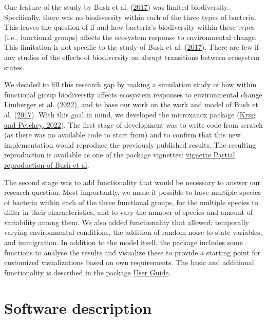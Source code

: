 \documentclass[
]{article}
\begin{document}
One feature of the study by Bush et al.
(\protect\hyperlink{ref-Bush2017}{2017}) was limited biodiversity.
Specifically, there was no biodiversity within each of the three types
of bacteria. This leaves the question of if and how bacteria's
biodiversity within these types (i.e., functional groups) affects the
ecosystem response to environmental change. This limitation is not
specific to the study of Bush et al.
(\protect\hyperlink{ref-Bush2017}{2017}). There are few if any studies
of the effects of biodiversity on abrupt transitions between ecosystem
states.

We decided to fill this research gap by making a simulation study of how
within functional group biodiversity affects ecosystem responses to
environmental change Limberger et al.
(\protect\hyperlink{ref-Limberger2022}{2022}), and to base our work on
the work and model of Bush et al.
(\protect\hyperlink{ref-Bush2017}{2017}). With this goal in mind, we
developed the microxanox package (\protect\hyperlink{ref-Krug2022}{Krug
and Petchey, 2022}). The first stage of development was to write code
from scratch (as there was no available code to start from) and to
confirm that this new implementation would reproduce the previously
published results. The resulting reproduction is available as one of the
package vignettes:
\href{https://uzh-peg.r-universe.dev/articles/microxanox/partial-reproduction-Bushetal2017.html}{vignette
Partial reproduction of Bush et al}.

The second stage was to add functionality that would be necessary to
answer our research question. Most importantly, we made it possible to
have multiple species of bacteria within each of the three functional
groups, for the multiple species to differ in their characteristics, and
to vary the number of species and amount of variability among them. We
also added functionality that allowed: temporally varying environmental
conditions, the addition of random noise to state variables, and
immigration. In addition to the model itself, the package includes some
functions to analyse the results and visualize these to provide a
starting point for customized visualizations based on own requirements.
The basic and additional functionality is described in the package
\href{https://uzh-peg.r-universe.dev/articles/microxanox/User-guide.html}{User
Guide}.

\hypertarget{software-description}{%
\section{Software description}\label{software-description}}
\end{document}
